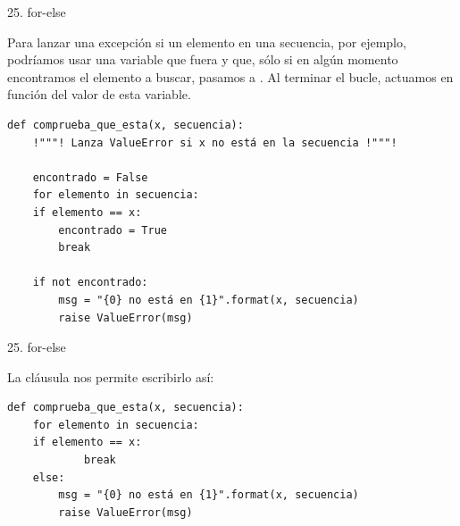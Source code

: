 \documentclass[14pt]{beamer}
\begin{document}
\begin{frame}[fragile]{25. for-else}
  \footnotesize
  \begin{block}{}
    \centering
    Para lanzar una excepción si un elemento  en una secuencia, por ejemplo, podríamos usar una
    variable que fuera  y que, sólo si en algún
    momento encontramos el elemento a buscar, pasamos a
    . Al terminar el bucle, actuamos en función del
    valor de esta variable.
  \end{block}

  \begin{exampleblock}{}
    \scriptsize
    \begin{lstlisting}[escapechar=!]
def comprueba_que_esta(x, secuencia):
    !"""! Lanza ValueError si x no está en la secuencia !"""!

    encontrado = False
    for elemento in secuencia:
    if elemento == x:
        encontrado = True
        break

    if not encontrado:
        msg = "{0} no está en {1}".format(x, secuencia)
        raise ValueError(msg)
    \end{lstlisting}
  \end{exampleblock}
\end{frame}

\begin{frame}[fragile]{25. for-else}
  \begin{block}{}
    \centering
    La cláusula  nos permite escribirlo así:
  \end{block}

  \begin{exampleblock}{}
    \scriptsize
    \begin{lstlisting}
def comprueba_que_esta(x, secuencia):
    for elemento in secuencia:
    if elemento == x:
            break
    else:
        msg = "{0} no está en {1}".format(x, secuencia)
        raise ValueError(msg)
    \end{lstlisting}
  \end{exampleblock}
\end{frame}
\end{document}
